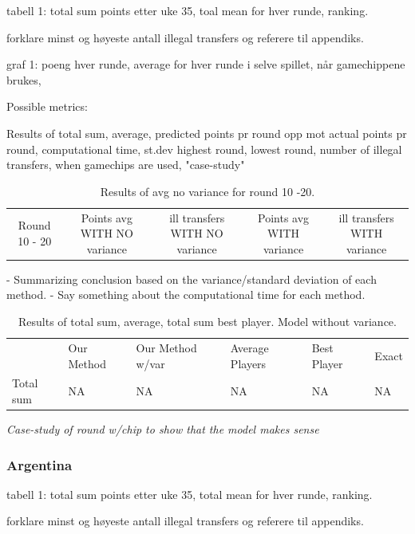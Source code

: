 tabell 1: total sum points etter uke 35, toal mean for hver runde, ranking. 

forklare minst og høyeste antall illegal transfers og referere til appendiks. 

graf 1: poeng hver runde, average for hver runde i selve spillet, når gamechippene brukes, 



Possible metrics: 

Results of total sum, average, predicted points pr round opp mot actual points pr round, computational time, st.dev highest round, lowest round, number of illegal transfers, when gamechips are used, "case-study"



\begin{table}[H]
    \centering
    \begin{tabular}{c|c|c|c|c}
        Round 10 - 20 & Points avg WITH NO variance & ill transfers WITH NO variance & Points avg WITH variance & ill transfers WITH variance\\
    \end{tabular}
    \caption{Results of avg no variance for round 10 -20.}
\end{table}

- Summarizing conclusion based on the variance/standard deviation of each method.
- Say something about the computational time for each method. 

\begin{table}[H]
\centering
\caption{Results of total sum, average, total sum best player. Model without variance.}
\begin{tabular}{llllll}
& Our Method & Our Method w/var  & Average Players & Best Player & Exact\\
Total sum  & NA  & NA & NA & NA & NA \\
\end{tabular}
\end{table}



\textit{Case-study of round w/chip to show that the model makes sense}

\subsubsection{Argentina}
 tabell 1: total sum points etter uke 35, total mean for hver runde, ranking. 

forklare minst og høyeste antall illegal transfers og referere til appendiks. 

